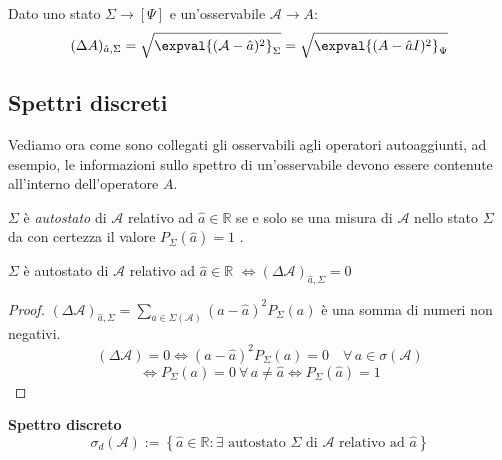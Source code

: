 \begin{remark}
    Dato uno stato \(\Sigma\to [\Psi]\) e un'osservabile \(\mathcal{A} \to A \):
   \begin{equation}
     (\Delta A )_{\hat{a}, \Sigma} = \sqrt{\expval{(\mathcal{A}-\hat{a})^2}_\Sigma}   = \sqrt{\expval{(A-\hat{a}I)^2}_{\Psi}}
   \end{equation}
\end{remark}

\subsection{Spettri discreti}

Vediamo ora come sono collegati gli osservabili agli operatori autoaggiunti,
ad esempio, le informazioni sullo spettro di un'osservabile devono essere contenute all'interno dell'operatore \(A\).
\begin{definition}
    \(\Sigma\) è \textit{autostato} di \(\mathcal{A}\) relativo ad \(\hat{a}\in \mathbb{R}\) se e solo se una misura di \(\mathcal{A}\) nello stato
    \(\Sigma\) da con certezza il valore \(P_\Sigma(\hat{a})=1\) .
\end{definition}


\begin{theorem}
    \(\Sigma\) è autostato di \(\mathcal{A}\) relativo ad \(\hat{a} \in \mathbb{R}\)   \(\iff (\Delta \mathcal{A})_{\hat{a},\Sigma}=0\)
\end{theorem}
\begin{proof}
    \((\Delta \mathcal{A})_{\hat{a}, \Sigma} = \sum_{a \in \Sigma(\mathcal{A})}(a-\hat{a})^2 P_{\Sigma}(a)\) è una somma di numeri non negativi.
    \[
        (\Delta\mathcal{A}) = 0 \iff (a- \hat{a})^2 P_\Sigma(a)= 0 \quad \forall \, a \in \sigma(\mathcal{A})
    \] 
    \[
        \iff P_\Sigma(a)= 0 \ \forall \, a \neq \hat{a}  \iff P_\Sigma(\hat{a})=1
    \]
\end{proof}

\begin{definition}  
    \textbf{Spettro discreto}
    \begin{equation}
        \sigma_d(\mathcal{A}):= \left\{ \hat{a} \in \mathbb{R} : \exists \text{ autostato } \Sigma \text{ di }\mathcal{A} \text{ relativo ad } \hat{a}\right\}
    \end{equation}
    
\end{definition}


